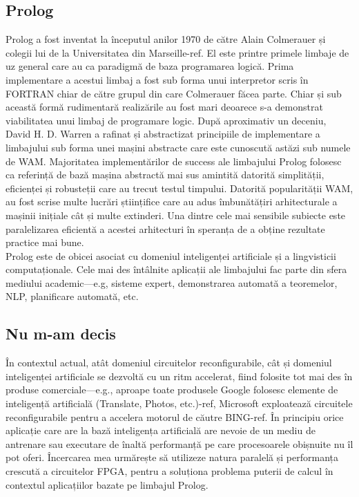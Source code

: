 \documentclass[12pt,a4paper,twoside]{report}
\begin{document}
\subsection{Prolog}
Prolog a fost inventat la începutul anilor 1970 de către Alain Colmerauer și colegii lui de la Universitatea din Marseille-ref. El este printre primele limbaje de uz general care au ca paradigmă de baza programarea logică. Prima implementare a acestui limbaj a fost sub forma unui interpretor scris în FORTRAN chiar de către grupul din care Colmerauer făcea parte. Chiar și sub această formă rudimentară realizările au fost mari deoarece s-a demonstrat viabilitatea unui limbaj de programare logic. După aproximativ un deceniu, David H. D. Warren a rafinat și abstractizat principiile de implementare a limbajului sub forma unei mașini abstracte care este cunoscută astăzi sub numele de WAM. Majoritatea implementărilor de success ale limbajului Prolog folosesc ca referință de bază mașina abstractă mai sus amintită datorită simplității, eficienței și robusteții care au trecut testul timpului. Datorită popularității WAM, au fost scrise multe lucrări științifice care au adus îmbunătățiri arhitecturale a mașinii inițiale cât și multe extinderi. Una dintre cele mai sensibile subiecte este paralelizarea eficientă a acestei arhitecturi în speranța de a obține rezultate practice mai bune. \\
Prolog este de obicei asociat cu domeniul inteligenței artificiale și a lingvisticii computaționale. Cele mai des întâlnite aplicații ale limbajului fac parte din sfera mediului academic—e.g, sisteme expert, demonstrarea automată a teoremelor, NLP, planificare automată, etc.
\subsection{Nu m-am decis}
În contextul actual, atât domeniul circuitelor reconfigurabile, cât și domeniul inteligenței artificiale se dezvoltă cu un ritm accelerat, fiind folosite tot mai des în produse comerciale—e.g., aproape toate produsele Google folosesc elemente de inteligență artificială (Translate, Photos, etc.)-ref, Microsoft exploatează circuitele reconfigurabile pentru a accelera motorul de căutre BING-ref. În principiu orice aplicație care are la bază inteligența artificială are nevoie de un mediu de antrenare sau executare de înaltă performanță pe care procesoarele obișnuite nu îl pot oferi. Încercarea mea urmărește să utilizeze natura paralelă și performanța crescută a circuitelor FPGA, pentru a soluționa problema puterii de calcul în contextul aplicațiilor bazate pe limbajul Prolog.
\end{document}
